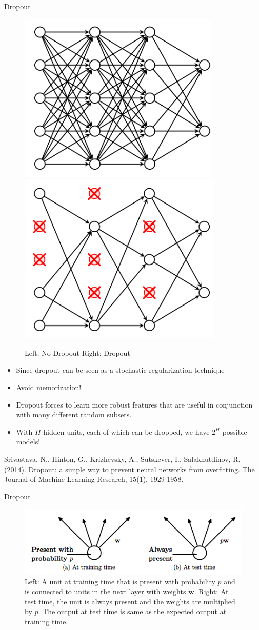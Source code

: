 \documentclass[xcolor=pdftex,dvipsnames,table,mathserif]{beamer}
\begin{document}
\begin{frame}{Dropout}
\begin{figure}
\includegraphics[width=.45 \columnwidth]{../graphics/NetworkDropoutNo}
\includegraphics[width=.45 \columnwidth]{../graphics/NetworkDropoutYes}
\caption{Left: No Dropout Right: Dropout}
\end{figure}
\begin{itemize}
\item Since dropout can be seen as a stochastic regularization technique
\item Avoid memorization!
\item Dropout forces to learn more robust features that are useful in conjunction with many different random subsets.
\item With $H$ hidden units, each of which can be dropped, we have $2^H$ possible models!
\end{itemize}
Srivastava, N., Hinton, G., Krizhevsky, A., Sutskever, I.,  Salakhutdinov, R. (2014). Dropout: a simple way to prevent neural networks from overfitting. The Journal of Machine Learning Research, 15(1), 1929-1958.
\end{frame}

\begin{frame}{Dropout}
\begin{figure}
\includegraphics[width=.85 \columnwidth]{../graphics/DropoutP}
\caption{Left: A unit at training time that is present with probability $p$ and is connected to units
in the next layer with weights $\mathbf{w}$. Right: At test time, the unit is always present and
the weights are multiplied by $p$. The output at test time is same as the expected output
at training time.}
\end{figure}
\end{frame}
\end{document}
